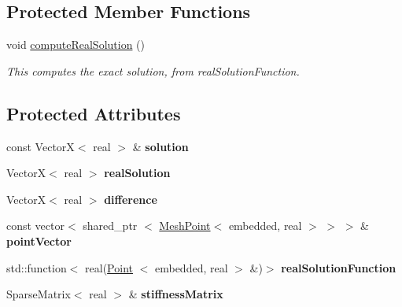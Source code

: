 \subsection*{\-Protected \-Member \-Functions}
\begin{DoxyCompactItemize}
\item 
\hypertarget{class_error_af104f894c3a83e26b85cc7a5f429dc21}{void \hyperlink{class_error_af104f894c3a83e26b85cc7a5f429dc21}{compute\-Real\-Solution} ()}\label{class_error_af104f894c3a83e26b85cc7a5f429dc21}

\begin{DoxyCompactList}\small\item\em \-This computes the exact solution, from real\-Solution\-Function. \end{DoxyCompactList}\end{DoxyCompactItemize}
\subsection*{\-Protected \-Attributes}
\begin{DoxyCompactItemize}
\item 
\hypertarget{class_error_a63e5ca94bf6ee10b531ae41fc1784ba9}{const \-Vector\-X$<$ real $>$ \& {\bfseries solution}}\label{class_error_a63e5ca94bf6ee10b531ae41fc1784ba9}

\item 
\hypertarget{class_error_a6fb9cc85ec7ed04f99bbc487d1201986}{\-Vector\-X$<$ real $>$ {\bfseries real\-Solution}}\label{class_error_a6fb9cc85ec7ed04f99bbc487d1201986}

\item 
\hypertarget{class_error_afb2549d0b0a6bfa0f81ea93a396fd462}{\-Vector\-X$<$ real $>$ {\bfseries difference}}\label{class_error_afb2549d0b0a6bfa0f81ea93a396fd462}

\item 
\hypertarget{class_error_abd75537e1d612c8f7b0ce238dc71d09a}{const vector$<$ shared\-\_\-ptr\*
$<$ \hyperlink{class_mesh_point}{\-Mesh\-Point}$<$ embedded, real $>$ $>$ $>$ \& {\bfseries point\-Vector}}\label{class_error_abd75537e1d612c8f7b0ce238dc71d09a}

\item 
\hypertarget{class_error_a9d0a0cfde3657a02ce55308a947543ee}{std\-::function$<$ real(\hyperlink{class_point}{\-Point}\*
$<$ embedded, real $>$ \&)$>$ {\bfseries real\-Solution\-Function}}\label{class_error_a9d0a0cfde3657a02ce55308a947543ee}

\item 
\hypertarget{class_error_abe45bf80209efc5704dd6311c24fbc53}{\-Sparse\-Matrix$<$ real $>$ \& {\bfseries stiffness\-Matrix}}\label{class_error_abe45bf80209efc5704dd6311c24fbc53}

\end{DoxyCompactItemize}


